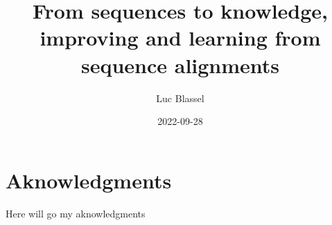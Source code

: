 \documentclass[
  11pt,
  twoside,
  BCOR=10mm,
  listof=totoc]{scrbook}
\title{From sequences to knowledge, improving and learning from sequence alignments}
\author{Luc Blassel}
\date{2022-09-28}
\begin{document}
\maketitle




\pagestyle{empty}

\cleardoubleevenpage

\frontmatter

\chapter{Aknowledgments}
Here will go my aknowledgments
\lipsum[7-9]

{
\setcounter{tocdepth}{2}
\tableofcontents
}
\listoffigures
\listoftables
\pagestyle{empty}
\end{document}
